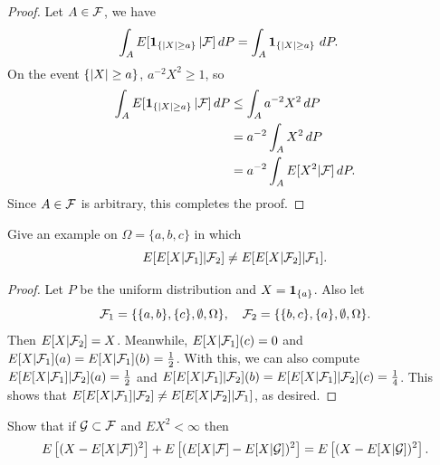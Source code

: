 \documentclass[a4paper]{article}
\begin{document}
\begin{proof}
  Let $A \in \mathcal{F}$, we have
  \begin{align*}
    \int_A E[ \operatorname{\mathbf{1}}_{\{\left\lvert X\right\rvert \geq a\}} | \mathcal{F}] \, d P
     & = \int_A \operatorname{\mathbf{1}}_{\{\left\lvert X\right\rvert \geq a\}} \, d P.
  \end{align*}
  On the event $\{\left\lvert X\right\rvert \geq a\}$, $a^{-2} X^2 \geq 1$, so
  \begin{align*}
    \int_A E[ \operatorname{\mathbf{1}}_{\{\left\lvert X\right\rvert \geq a\}} | \mathcal{F}] \, d P
     & \leq \int_A a^{-2} X^2 \, d P           \\
     & = a^{-2} \int_A X^2 \, d P              \\
     & = a^{-2} \int_A E [X^2 | \mathcal{F}] \, d P.
  \end{align*}
  Since $A \in \mathcal{F}$ is arbitrary, this completes the proof.

\end{proof}

\begin{ex}[Durrett 4.1.5]
  Give an example on $\Omega = \{a, b, c\}$ in which
  \[
    E [E [X | \mathcal{F}_1] | \mathcal{F}_2] \neq E [E [X | \mathcal{F}_2] | \mathcal{F}_1].
  \]
\end{ex}

\begin{proof}
  Let $P$ be the uniform distribution and $X = \operatorname{\mathbf{1}}_{\{a\}}$.
  Also let
  \[
    \mathcal{F}_1 = \{ \{a, b\}, \{c\}, \emptyset, \Omega\}, \quad
    \mathcal{F}_2 = \{ \{b, c\}, \{a\}, \emptyset, \Omega\}.
  \]
  Then $E[X | \mathcal{F}_2] = X$. Meanwhile, $E[X | \mathcal{F}_1] (c) = 0$
  and $E[X | \mathcal{F}_1] (a) = E[X | \mathcal{F}_1] (b) = \frac{1}{2}$. With this,
  we can also compute $E[E[X | \mathcal{F}_1] | \mathcal{F}_2] (a) = \frac{1}{2}$
  and $E[E[X | \mathcal{F}_1] | \mathcal{F}_2] (b) = E[E[X | \mathcal{F}_1] | \mathcal{F}_2] (c)
    = \frac{1}{4}$. This shows that $E [E [X | \mathcal{F}_1] | \mathcal{F}_2] \neq
    E [E [X | \mathcal{F}_2] | \mathcal{F}_1]$, as desired.

\end{proof}

\begin{ex}[Durrett 4.1.6]
  Show that if $\mathcal{G} \subset \mathcal{F}$ and $E X^2 < \infty$ then
  \[
    E \left[ (X - E[X | \mathcal{F}])^2 \right]
    + E \left[ (E [X | \mathcal{F}] - E[X | \mathcal{G}])^2 \right]
    = E \left[ (X - E [X | \mathcal{G}])^2 \right].
  \]
\end{ex}
\end{document}
